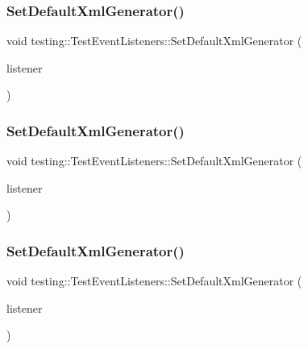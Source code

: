 \subsubsection{\texorpdfstring{SetDefaultXmlGenerator()}{SetDefaultXmlGenerator()}\hspace{0.1cm}{\footnotesize\ttfamily [1/3]}}
{\footnotesize\ttfamily void testing\+::\+Test\+Event\+Listeners\+::\+Set\+Default\+Xml\+Generator (\begin{DoxyParamCaption}\item[{\mbox{\hyperlink{classtesting_1_1_test_event_listener}{Test\+Event\+Listener}} $\ast$}]{listener }\end{DoxyParamCaption})\hspace{0.3cm}{\ttfamily [private]}}

\mbox{\label{classtesting_1_1_test_event_listeners_a36dbac47563ef8bb78cb467d11f5b4d9}} 
\subsubsection{\texorpdfstring{SetDefaultXmlGenerator()}{SetDefaultXmlGenerator()}\hspace{0.1cm}{\footnotesize\ttfamily [2/3]}}
{\footnotesize\ttfamily void testing\+::\+Test\+Event\+Listeners\+::\+Set\+Default\+Xml\+Generator (\begin{DoxyParamCaption}\item[{\mbox{\hyperlink{classtesting_1_1_test_event_listener}{Test\+Event\+Listener}} $\ast$}]{listener }\end{DoxyParamCaption})\hspace{0.3cm}{\ttfamily [private]}}

\mbox{\label{classtesting_1_1_test_event_listeners_a36dbac47563ef8bb78cb467d11f5b4d9}} 
\subsubsection{\texorpdfstring{SetDefaultXmlGenerator()}{SetDefaultXmlGenerator()}\hspace{0.1cm}{\footnotesize\ttfamily [3/3]}}
{\footnotesize\ttfamily void testing\+::\+Test\+Event\+Listeners\+::\+Set\+Default\+Xml\+Generator (\begin{DoxyParamCaption}\item[{\mbox{\hyperlink{classtesting_1_1_test_event_listener}{Test\+Event\+Listener}} $\ast$}]{listener }\end{DoxyParamCaption})\hspace{0.3cm}{\ttfamily [private]}}

